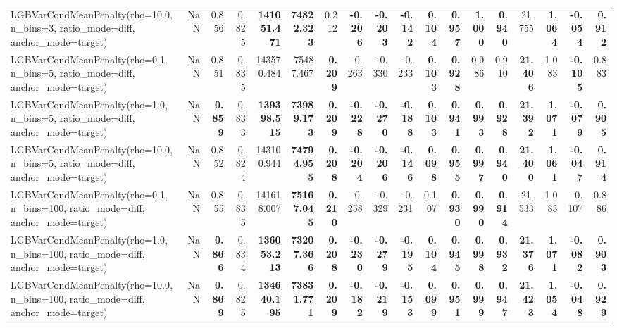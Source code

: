 \documentclass[11pt]{article}
\theoremstyle{plain}
\theoremstyle{definition}
\newcommand{\1}{\mathbf{1}}
\begin{document}
\begin{table}[htbp]
{\begin{tabular}{lrrrrrrrrrrrrrrrrr}
LGBVarCondMeanPenalty(rho=10.0, n\_bins=3, ratio\_mode=diff, anchor\_mode=target) & NaN & 0.856 & 0.825 & \textbf{141051.471} & \textbf{74822.323} & 0.212 & \textbf{-0.206} & \textbf{-0.203} & \textbf{-0.142} & \textbf{0.104} & \textbf{0.957} & \textbf{1.000} & \textbf{0.940} & 21.755 & \textbf{1.064} & \textbf{-0.054} & \textbf{0.912} \\
LGBVarCondMeanPenalty(rho=0.1, n\_bins=5, ratio\_mode=diff, anchor\_mode=target) & NaN & 0.851 & 0.835 & 143570.484 & 75487.467 & \textbf{0.209} & -0.263 & -0.330 & -0.233 & \textbf{0.103} & \textbf{0.928} & 0.986 & 0.910 & \textbf{21.406} & 1.083 & \textbf{-0.105} & 0.883 \\
LGBVarCondMeanPenalty(rho=1.0, n\_bins=5, ratio\_mode=diff, anchor\_mode=target) & NaN & \textbf{0.859} & 0.833 & \textbf{139398.515} & \textbf{73989.173} & \textbf{0.209} & \textbf{-0.228} & \textbf{-0.270} & \textbf{-0.188} & \textbf{0.103} & \textbf{0.941} & \textbf{0.993} & \textbf{0.928} & \textbf{21.392} & \textbf{1.071} & \textbf{-0.079} & \textbf{0.905} \\
LGBVarCondMeanPenalty(rho=10.0, n\_bins=5, ratio\_mode=diff, anchor\_mode=target) & NaN & 0.852 & 0.824 & 143100.944 & \textbf{74794.955} & \textbf{0.208} & \textbf{-0.204} & \textbf{-0.206} & \textbf{-0.146} & \textbf{0.098} & \textbf{0.955} & \textbf{0.997} & \textbf{0.940} & \textbf{21.400} & \textbf{1.061} & \textbf{-0.047} & \textbf{0.914} \\
LGBVarCondMeanPenalty(rho=0.1, n\_bins=100, ratio\_mode=diff, anchor\_mode=target) & NaN & 0.855 & 0.835 & 141618.007 & \textbf{75167.045} & \textbf{0.210} & -0.258 & -0.329 & -0.231 & 0.107 & \textbf{0.930} & \textbf{0.990} & \textbf{0.914} & 21.533 & 1.083 & -0.107 & 0.886 \\
LGBVarCondMeanPenalty(rho=1.0, n\_bins=100, ratio\_mode=diff, anchor\_mode=target) & NaN & \textbf{0.866} & 0.834 & \textbf{136053.213} & \textbf{73207.366} & \textbf{0.208} & \textbf{-0.230} & \textbf{-0.279} & \textbf{-0.195} & \textbf{0.104} & \textbf{0.945} & \textbf{0.998} & \textbf{0.932} & \textbf{21.376} & \textbf{1.071} & \textbf{-0.082} & \textbf{0.903} \\
LGBVarCondMeanPenalty(rho=10.0, n\_bins=100, ratio\_mode=diff, anchor\_mode=target) & NaN & \textbf{0.869} & 0.825 & \textbf{134640.195} & \textbf{73831.771} & \textbf{0.209} & \textbf{-0.182} & \textbf{-0.219} & \textbf{-0.153} & \textbf{0.099} & \textbf{0.951} & \textbf{0.999} & \textbf{0.947} & \textbf{21.423} & \textbf{1.054} & \textbf{-0.048} & \textbf{0.929} \\

\end{tabular}}
\end{table}
\end{document}
